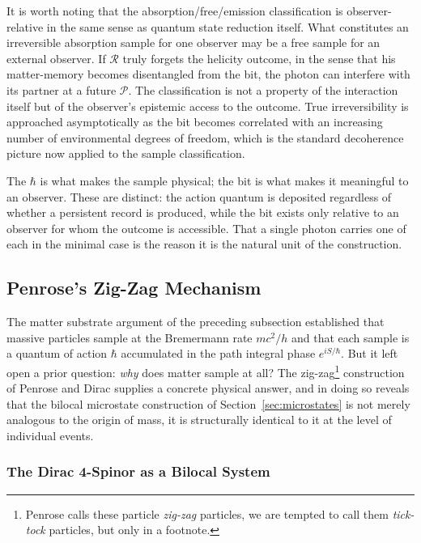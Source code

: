 \documentclass[12pt,a4paper]{article}
\begin{document}
It is worth noting that the absorption/free/emission classification 
is observer-relative in the same sense as quantum state reduction 
itself. What constitutes an irreversible absorption sample for one 
observer may be a free sample for an external observer. If $\mathcal{R}$ truly forgets the helicity 
outcome, in the sense that his matter-memory becomes disentangled 
from the bit, the photon can interfere with its partner at a 
future $\mathcal{P}$. The classification is not a property of the interaction 
itself but of the observer's epistemic access to the outcome. True 
irreversibility is approached asymptotically as the bit becomes 
correlated with an increasing number of environmental degrees of 
freedom, which is the standard decoherence picture now applied to 
the sample classification.

The $\hbar$ is what makes the sample physical; the bit is what 
makes it meaningful to an observer. These are distinct: the action 
quantum is deposited regardless of whether a persistent record is 
produced, while the bit exists only relative to an observer for 
whom the outcome is accessible. That a single photon carries one 
of each in the minimal case is the reason it is the natural unit 
of the construction.

\subsection{Penrose's Zig-Zag Mechanism}
\label{sec:zigzag}

The matter substrate argument of the preceding subsection established that massive particles
sample at the Bremermann rate $mc^2/h$ and that each sample is a quantum of action $\hbar$
accumulated in the path integral phase $e^{iS/\hbar}$. But it left open a prior question:
\emph{why} does matter sample at all? The zig-zag\footnote{Penrose calls these particle {\it zig-zag} particles, we are tempted to call them {\it tick-tock} particles, but only in a footnote.} construction of Penrose and Dirac supplies
a concrete physical answer, and in doing so reveals that the bilocal microstate construction
of Section~\ref{sec:microstates} is not merely analogous to the origin of mass, it is
structurally identical to it at the level of individual events.

\subsubsection{The Dirac 4-Spinor as a Bilocal System}
\end{document}
